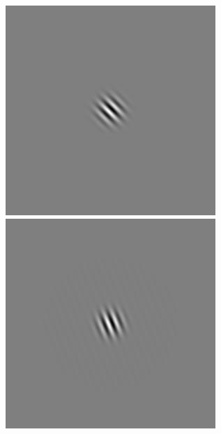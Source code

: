 \begin{figure}[ht]
\begin{center}
 \includegraphics[width=\columnwidth/9]{ch4/figures/iGabor2_6.jpg}
 \includegraphics[width=\columnwidth/9]{ch4/figures/iGabor2_7.jpg}\\

\end{center}
\end{figure}
